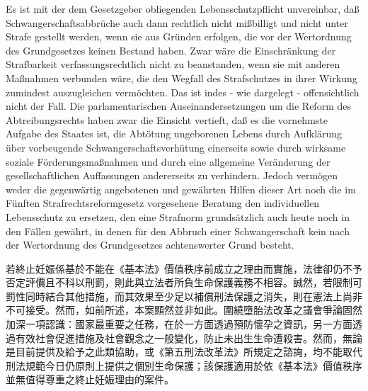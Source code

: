 \documentclass[12pt]{article}
\begin{document}
\syncleft
\begin{sourcepara}
Es ist mit der dem Gesetzgeber obliegenden Lebensschutzpflicht unvereinbar, daß Schwangerschaftsabbrüche auch dann rechtlich nicht mißbilligt und nicht unter Strafe gestellt werden, wenn sie aus Gründen erfolgen, die vor der Wertordnung des Grundgesetzes keinen Bestand haben. Zwar wäre die Einschränkung der Strafbarkeit verfassungsrechtlich nicht zu beanstanden, wenn sie mit anderen Maßnahmen verbunden wäre, die den Wegfall des Strafschutzes in ihrer Wirkung zumindest auszugleichen vermöchten. Das ist indes - wie dargelegt - offensichtlich nicht der Fall. Die parlamentarischen Auseinandersetzungen um die Reform des Abtreibungsrechts haben zwar die Einsicht vertieft, daß es die vornehmste Aufgabe des Staates ist, die Abtötung ungeborenen Lebens durch Aufklärung über vorbeugende Schwangerschaftsverhütung einerseits sowie durch wirksame soziale Förderungsmaßnahmen und durch eine allgemeine Veränderung der gesellschaftlichen Auffassungen andererseits zu verhindern. Jedoch vermögen weder die gegenwärtig angebotenen und gewährten Hilfen dieser Art noch die im Fünften Strafrechtsreformgesetz vorgesehene Beratung den individuellen Lebensschutz zu ersetzen, den eine Strafnorm grundsätzlich auch heute noch in den Fällen gewährt, in denen für den Abbruch einer Schwangerschaft kein nach der Wertordnung des Grundgesetzes achtenswerter Grund besteht.
\end{sourcepara}
\begin{transpara}
若終止妊娠係基於不能在《基本法》價值秩序前成立之理由而實施，法律卻仍不予否定評價且不科以刑罰，則此與立法者所負生命保護義務不相容。誠然，若限制可罰性同時結合其他措施，而其效果至少足以補償刑法保護之消失，則在憲法上尚非不可接受。然而，如前所述，本案顯然並非如此。圍繞墮胎法改革之議會爭論固然加深一項認識：國家最重要之任務，在於一方面透過預防懷孕之資訊，另一方面透過有效社會促進措施及社會觀念之一般變化，防止未出生生命遭殺害。然而，無論是目前提供及給予之此類協助，或《第五刑法改革法》所規定之諮詢，均不能取代刑法規範今日仍原則上提供之個別生命保護；該保護適用於依《基本法》價值秩序並無值得尊重之終止妊娠理由的案件。
\end{transpara}
\end{document}
